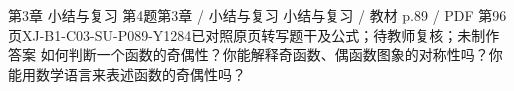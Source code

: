 \par\noindent\begin{minipage}{\linewidth}
\begin{bankitem}{第3章 小结与复习 第4题}{第3章 / 小结与复习 小结与复习 / 教材 p.89 / PDF 第96页}{XJ-B1-C03-SU-P089-Y1284}{已对照原页转写题干及公式；待教师复核；未制作答案}
如何判断一个函数的奇偶性？你能解释奇函数、偶函数图象的对称性吗？你能用数学语言来表述函数的奇偶性吗？
\end{bankitem}
\end{minipage}\par\medskip
